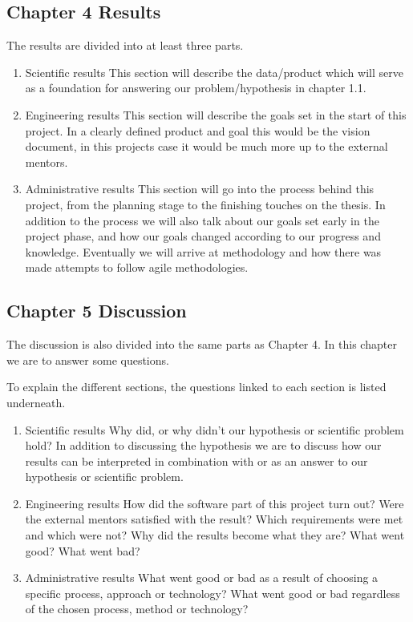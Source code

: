 \subsection{Chapter 4 Results}
The results are divided into at least three parts. \\
\begin{enumerate}
    \item Scientific results
    This section will describe the data/product which will serve as a foundation for answering our problem/hypothesis in chapter 1.1.
    
    \item Engineering results
    This section will describe the goals set in the start of this project. In a clearly defined product and goal this would be the vision document, in this projects case it would be much more up to the external mentors. %
    
    \item Administrative results
    This section will go into the process behind this project, from the planning stage to the finishing touches on the thesis. In addition to the process we will also talk about our goals set early in the project phase, and how our goals changed according to our progress and knowledge. Eventually we will arrive at methodology and how there was made attempts to follow agile methodologies.
    
\end{enumerate}

\subsection{Chapter 5 Discussion}
The discussion is also divided into the same parts as Chapter 4. %
In this chapter we are to answer some questions.

To explain the different sections, the questions linked to each section is listed underneath.
\begin{enumerate}
    \item Scientific results
    Why did, or why didn't our hypothesis or scientific problem hold?
    In addition to discussing the hypothesis we are to discuss how our results can be interpreted in combination with or as an answer to our hypothesis or scientific problem.
    
    \item Engineering results
    How did the software part of this project turn out? Were the external mentors satisfied with the result? Which requirements were met and which were not? Why did the results become what they are? What went good? What went bad?
    
    \item Administrative results
    What went good or bad as a result of choosing a specific process, approach or technology? What went good or bad regardless of the chosen process, method or technology?
    
\end{enumerate}

